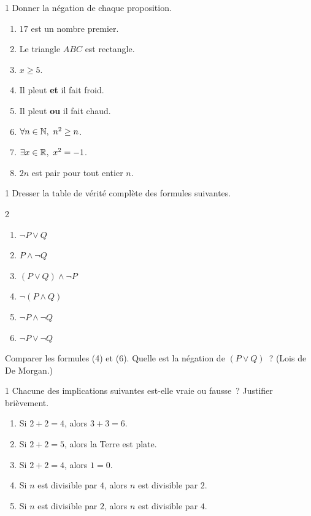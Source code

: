 \begin{exo}{1}
Donner la n\'egation de chaque proposition.
\begin{enumerate}
  \item $17$ est un nombre premier.
  \item Le triangle $ABC$ est rectangle.
  \item $x \geq 5$.
  \item Il pleut \textbf{et} il fait froid.
  \item Il pleut \textbf{ou} il fait chaud.
  \item $\forall n \in \mathbb{N},\ n^2 \geq n$.
  \item $\exists x \in \mathbb{R},\ x^2 = -1$.
  \item $2n$ est pair pour tout entier $n$.
\end{enumerate}
\end{exo}

\begin{exo}{1}
Dresser la table de v\'erit\'e compl\`ete des formules suivantes.
\begin{multicols}{2}
\begin{enumerate}
  \item $\lnot P \lor Q$
  \item $P \land \lnot Q$
  \item $(P \lor Q) \land \lnot P$
  \item $\lnot(P \land Q)$
  \item $\lnot P \land \lnot Q$
  \item $\lnot P \lor \lnot Q$
\end{enumerate}
\end{multicols}
Comparer les formules (4) et (6). Quelle est la n\'egation de
$(P\lor Q)$~? (Lois de De Morgan.)
\end{exo}

\begin{exo}{1}
Chacune des implications suivantes est-elle vraie ou fausse~?
Justifier bri\`evement.
\begin{enumerate}
  \item Si $2 + 2 = 4$, alors $3 + 3 = 6$.
  \item Si $2 + 2 = 5$, alors la Terre est plate.
  \item Si $2 + 2 = 4$, alors $1 = 0$.
  \item Si $n$ est divisible par $4$, alors $n$ est divisible par $2$.
  \item Si $n$ est divisible par $2$, alors $n$ est divisible par $4$.
\end{enumerate}
\end{exo}


